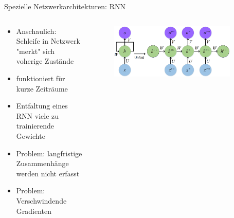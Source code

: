 \documentclass[aspectratio=1610, xcolor=dvipsnames, 9pt]{beamer}
\begin{document}
  \begin{frame}{Spezielle Netzwerkarchitekturen: RNN}
        \begin{columns}
          \begin{column}{0.6\textwidth}
            \begin{itemize}
              \item Anschaulich: Schleife in Netzwerk "merkt" sich voherige Zustände \newline 
              \item funktioniert für kurze Zeiträume \newline 
              \item Entfaltung eines RNN \rightarrow viele zu trainierende Gewichte \newline 
              \item Problem: langfristige Zusammenhänge werden nicht erfasst \newline 
              \item Problem: Verschwindende Gradienten
            \end{itemize}
          \end{column}
           \begin{column}{0.4\textwidth}
             \begin{figure}
               \centering
                           \includegraphics[width=0.9\textwidth]{images/RNN.png}
               \end{figure}

           \end{column}
        \end{columns}
      \end{frame}     
      
\end{document}
